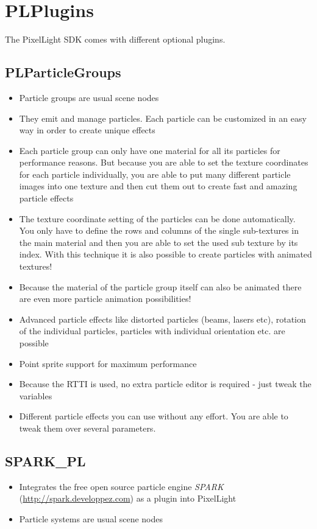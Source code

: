 \chapter{PLPlugins}
The PixelLight SDK comes with different optional plugins.





\section{PLParticleGroups}
\begin{itemize}
\item{Particle groups are usual scene nodes}
\item{They emit and manage particles. Each particle can be customized in an easy way in order to create unique effects}
\item{Each particle group can only have one material for all its particles for performance reasons. But because you are able to set the texture coordinates for each particle individually, you are able to put many different particle images into one texture and then cut them out to create fast and amazing particle effects}
\item{The texture coordinate setting of the particles can be done automatically. You only have to define the rows and columns of the single sub-textures in the main material and then you are able to set the used sub texture by its index. With this technique it is also possible to create particles with animated textures!}
\item{Because the material of the particle group itself can also be animated there are even more particle animation possibilities!}
\item{Advanced particle effects like distorted particles (beams, lasers etc), rotation of the individual particles, particles with individual orientation etc. are possible}
\item{Point sprite support for maximum performance}
\item{Because the RTTI is used, no extra particle editor is required - just tweak the variables}
\item{Different particle effects you can use without any effort. You are able to tweak them over several parameters.}
\end{itemize}




\section{SPARK\_PL}
\begin{itemize}
\item{Integrates the free open source particle engine \emph{SPARK} (\url{http://spark.developpez.com}) as a plugin into PixelLight}
\item{Particle systems are usual scene nodes}
\end{itemize}




